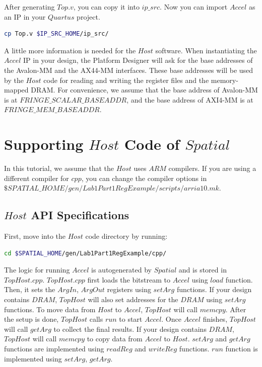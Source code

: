 \documentclass{article}
\begin{document}
    After generating $Top.v$, you can copy it into $ip\_src$.
    Now you can import $Accel$ as an IP in your $Quartus$ project.
    \begin{lstlisting}[language=bash]
    cp Top.v $IP_SRC_HOME/ip_src/
    \end{lstlisting}
    
    A little more information is needed for the $Host$ software.
    When instantiating the $Accel$ IP in your design,
    the Platform Designer will ask for the base addresses of the Avalon-MM and the AX44-MM interfaces.
    These base addresses will be used by the $Host$ code for reading and writing the register files and the memory-mapped DRAM.
    For convenience, we assume that the base address of Avalon-MM is at $FRINGE\_SCALAR\_BASEADDR$,
    and the base address of AXI4-MM is at $FRINGE\_MEM\_BASEADDR$.
    
    \section{Supporting $Host$ Code of $Spatial$}
    In this tutorial, we assume that the $Host$ uses $ARM$ compilers.
    If you are using a different compiler for $cpp$, you can change the compiler options in
    $\$SPATIAL\_HOME/gen/Lab1Part1RegExample/scripts/arria10.mk$.
    
    \subsection{$Host$ API Specifications}
    First, move into the $Host$ code directory by running:
    \begin{lstlisting}[language=bash]
    cd $SPATIAL_HOME/gen/Lab1Part1RegExample/cpp/
    \end{lstlisting}
    
    The logic for running $Accel$ is autogenerated by $Spatial$ and is stored in $TopHost.cpp$.
    $TopHost.cpp$ first loads the bitstream to $Accel$ using $load$ function.
    Then, it sets the $ArgIn$, $ArgOut$ registers using $setArg$ functions.
    If your design contains $DRAM$,  $TopHost$ will also set addresses for the $DRAM$ using $setArg$ functions.
    To move data from $Host$ to $Accel$, $TopHost$ will call $memcpy$.
    After the setup is done, $TopHost$ calls $run$ to start $Accel$.
    Once $Accel$ finishes, $TopHost$ will call $getArg$ to collect the final results.
    If your design contains $DRAM$, $TopHost$ will call $memcpy$ to copy data from $Accel$ to $Host$.
    $setArg$ and $getArg$ functions are implemented using $readReg$ and $writeReg$ functions.
    $run$ function is implemented using $setArg$, $getArg$.
    
\end{document}
